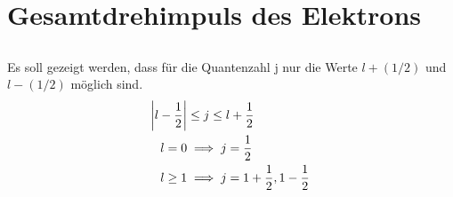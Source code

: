 \section{Gesamtdrehimpuls des Elektrons}

\subsection{}
Es soll gezeigt werden, dass für die Quantenzahl j nur die Werte $l + (1/2)$ und
$l - (1/2)$ möglich sind.
\begin{align*}
 \abs{l-\frac12} &\leq j \leq l + \frac12\\
 l = 0 &\implies j = \frac12\\
 l \geq 1 &\implies j = 1 + \frac12, 1 -\frac12
\end{align*}


